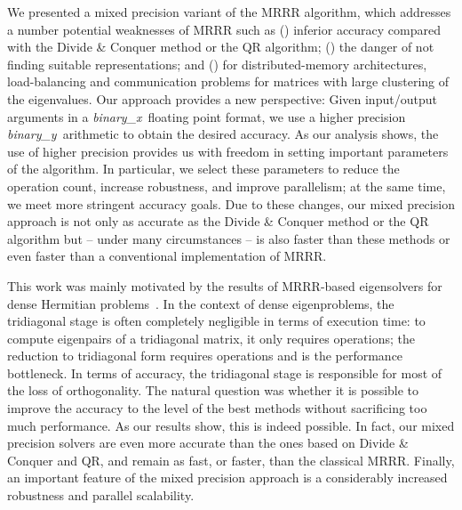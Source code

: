 \documentclass[final]{siamltex}
\newcommand{\binaryx}{{\it binary\_\hspace*{1pt}x}}
\newcommand{\binaryy}{{\it binary\_\hspace*{0pt}y}}
\begin{document}
We presented a mixed precision variant of the MRRR algorithm, which addresses a
number potential weaknesses of MRRR such as () inferior
accuracy compared with the Divide \& Conquer method or the QR algorithm;
() the danger of not finding suitable representations; and () for distributed-memory
architectures, load-balancing and
communication problems for matrices with large clustering of the
eigenvalues. Our approach provides a
new perspective: Given input/output arguments in a \binaryx\ floating
point format, we use a higher precision \binaryy\ arithmetic to
obtain the desired accuracy. As our analysis shows, the use of higher
precision provides us with freedom in setting important parameters of the
algorithm. In particular, we select these parameters to reduce the operation count,
increase robustness, and improve parallelism; at the same time, we meet
more stringent accuracy goals. Due to these changes, our mixed precision
approach is not only as accurate as the Divide \& Conquer method or the QR algorithm but -- under many
circumstances --  is also faster than  
these methods or even faster than a conventional implementation of MRRR. 

This work was mainly motivated by the results of MRRR-based eigensolvers for
dense Hermitian problems~\cite{EleMRRR}. In the context of dense
eigenproblems, the tridiagonal stage is often completely negligible
in terms of execution time: to compute  eigenpairs of a tridiagonal matrix, it
only requires  operations; the reduction to
tridiagonal form requires  operations and is the performance
bottleneck. In terms of accuracy, the 
tridiagonal stage is responsible for most of the loss of orthogonality. The
natural question was whether it is possible to improve the accuracy to the
level of the best methods without sacrificing too much performance. As
our results show, this is indeed possible. In fact, our mixed precision
solvers are even more accurate than the ones based on Divide \& Conquer and
QR, and remain as fast, or faster, than the classical MRRR. 
Finally, an important feature of the mixed precision approach is a
considerably increased robustness 
and parallel scalability. 



\footnotesize


\end{document}
